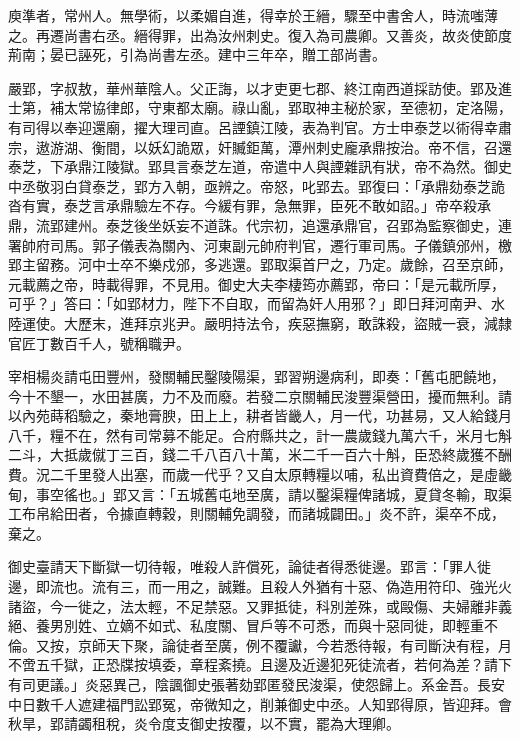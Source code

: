 \begin{pinyinscope}
 庾準者，常州人。無學術，以柔媚自進，得幸於王縉，驟至中書舍人，時流嗤薄之。再遷尚書右丞。縉得罪，出為汝州刺史。復入為司農卿。又善炎，故炎使節度荊南；晏已誣死，引為尚書左丞。建中三年卒，贈工部尚書。



 嚴郢，字叔敖，華州華陰人。父正誨，以才吏更七郡、終江南西道採訪使。郢及進士第，補太常協律郎，守東都太廟。祿山亂，郢取神主秘於家，至德初，定洛陽，有司得以奉迎還廟，擢大理司直。呂諲鎮江陵，表為判官。方士申泰芝以術得幸肅宗，遨游湖、衡間，以妖幻詭眾，奸贓鉅萬，潭州刺史龐承鼎按治。帝不信，召還泰芝，下承鼎江陵獄。郢具言泰芝左道，帝遣中人與諲雜訊有狀，帝不為然。御史中丞敬羽白貸泰芝，郢方入朝，亟辨之。帝怒，叱郢去。郢復曰：「承鼎劾泰芝詭沓有實，泰芝言承鼎驗左不存。今緩有罪，急無罪，臣死不敢如詔。」帝卒殺承鼎，流郢建州。泰芝後坐妖妄不道誅。代宗初，追還承鼎官，召郢為監察御史，連署帥府司馬。郭子儀表為關內、河東副元帥府判官，遷行軍司馬。子儀鎮邠州，檄郢主留務。河中士卒不樂戍邠，多逃還。郢取渠首尸之，乃定。歲餘，召至京師，元載薦之帝，時載得罪，不見用。御史大夫李棲筠亦薦郢，帝曰：「是元載所厚，可乎？」答曰：「如郢材力，陛下不自取，而留為奸人用邪？」即日拜河南尹、水陸運使。大歷末，進拜京兆尹。嚴明持法令，疾惡撫窮，敢誅殺，盜賊一衰，減隸官匠丁數百千人，號稱職尹。



 宰相楊炎請屯田豐州，發關輔民鑿陵陽渠，郢習朔邊病利，即奏：「舊屯肥饒地，今十不墾一，水田甚廣，力不及而廢。若發二京關輔民浚豐渠營田，擾而無利。請以內苑蒔稻驗之，秦地膏腴，田上上，耕者皆畿人，月一代，功甚易，又人給錢月八千，糧不在，然有司常募不能足。合府縣共之，計一農歲錢九萬六千，米月七斛二斗，大抵歲僦丁三百，錢二千八百八十萬，米二千一百六十斛，臣恐終歲獲不酬費。況二千里發人出塞，而歲一代乎？又自太原轉糧以哺，私出資費倍之，是虛畿甸，事空徭也。」郢又言：「五城舊屯地至廣，請以鑿渠糧俾諸城，夏貸冬輸，取渠工布帛給田者，令據直轉穀，則關輔免調發，而諸城闢田。」炎不許，渠卒不成，棄之。



 御史臺請天下斷獄一切待報，唯殺人許償死，論徒者得悉徙邊。郢言：「罪人徙邊，即流也。流有三，而一用之，誠難。且殺人外猶有十惡、偽造用符印、強光火諸盜，今一徙之，法太輕，不足禁惡。又罪抵徒，科別差殊，或毆傷、夫婦離非義絕、養男別姓、立嫡不如式、私度關、冒戶等不可悉，而與十惡同徙，即輕重不倫。又按，京師天下聚，論徒者至廣，例不覆讞，今若悉待報，有司斷決有程，月不啻五千獄，正恐牒按填委，章程紊撓。且邊及近邊犯死徒流者，若何為差？請下有司更議。」炎惡異己，陰諷御史張著劾郢匿發民浚渠，使怨歸上。系金吾。長安中日數千人遮建福門訟郢冤，帝微知之，削兼御史中丞。人知郢得原，皆迎拜。會秋旱，郢請蠲租稅，炎令度支御史按覆，以不實，罷為大理卿。




\end{pinyinscope}
